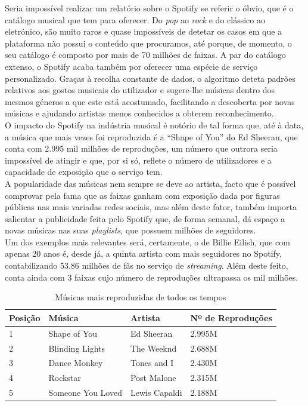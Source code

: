 Seria impossível realizar um relatório sobre o Spotify se referir o óbvio, que é o catálogo musical que tem para oferecer. Do \textit{pop} ao \textit{rock} e do clássico ao eletrónico, são muito raros e quase impossíveis de detetar os casos em que a plataforma não possui o conteúdo que procuramos, até porque, de momento, o seu catálogo é composto por mais de 70 milhões de faixas. A par do catálogo extenso, o Spotify acaba também por oferecer uma espécie de serviço personalizado. Graças à recolha constante de dados, o algoritmo deteta padrões relativos aos gostos musicais do utilizador e sugere-lhe músicas dentro dos mesmos géneros a que este está acostumado, facilitando a descoberta por novas músicas e ajudando artistas menos conhecidos a obterem reconhecimento.\\ 
O impacto do Spotify na indústria musical é notório de tal forma que, até à data, a música que mais vezes foi reproduzida é a “Shape of You” do Ed Sheeran, que conta com 2.995 mil milhões de reproduções, um número que outrora seria impossível de atingir e que, por si só, reflete o número de utilizadores e a capacidade de exposição que o serviço tem.\\
A popularidade das músicas nem sempre se deve ao artista, facto que é possível comprovar pela fama que as faixas ganham com exposição dada por figuras públicas nas mais variadas redes sociais, mas além deste fator, também importa salientar a publicidade feita pelo Spotify que, de forma semanal, dá espaço a novas músicas nas suas \textit{playlists}, que possuem milhões de seguidores.\\
Um dos exemplos mais relevantes será, certamente, o de Billie Eilish, que com apenas 20 anos é, desde já, a quinta artista com mais seguidores no Spotify, contabilizando 53.86 milhões de fãs no serviço de \textit{streaming}. Além deste feito, conta ainda com 3 faixas cujo número de reproduções ultrapassa os mil milhões.


\begin{table}[H]
	\centering
	\caption{Músicas mais reproduzidas de todos os tempos}
	\begin{tabular}{l|l|l|l}\hline
	Posição & Música & Artista & Nº de Reproduções \\
	\hline
	1       &    Shape of You    &   Ed Sheeran   &    2.995M        \\
	2       &    Blinding Lights    & The Weeknd  & 2.688M   \\
	3       &     Dance Monkey   &  Tones and I       &  2.430M   \\
	4       &   Rockstar  &   Post Malone    &      2.315M             \\
	5       &   Someone You Loved     &   Lewis Capaldi      &  2.188M      
\end{tabular}
\end{table}
